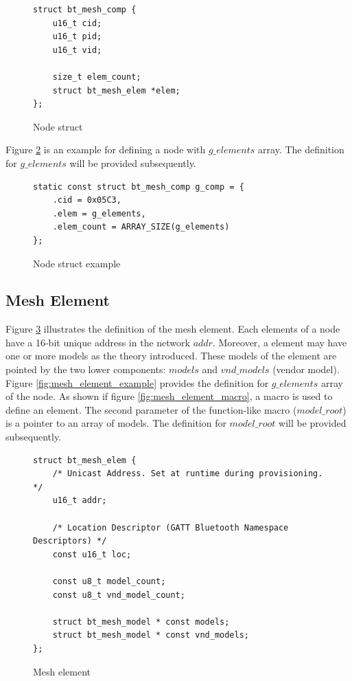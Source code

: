 \documentclass[\main/main.tex]{subfiles}
\begin{document}
\begin{figure}[H]
    \begin{lstlisting}[style=CStyle]
struct bt_mesh_comp {
	u16_t cid;
	u16_t pid;
	u16_t vid;

	size_t elem_count;
	struct bt_mesh_elem *elem;
};
    \end{lstlisting}
    \caption{Node struct}
    \label{fig:node_struct}
\end{figure}

Figure \ref{fig:node_struct_example} is an example for defining a node with $g\_elements$ array. The definition for  $g\_elements$ will be provided subsequently.
\begin{figure}[H]
    \begin{lstlisting}[style=CStyle]
static const struct bt_mesh_comp g_comp = {
    .cid = 0x05C3,
    .elem = g_elements,
    .elem_count = ARRAY_SIZE(g_elements)
};
    \end{lstlisting}
    \caption{Node struct example}
    \label{fig:node_struct_example}
\end{figure}

\subsection{Mesh Element}
Figure \ref{fig:mesh_element} illustrates the definition of the mesh element. Each elements of a node have a 16-bit unique address in the network $addr$. Moreover, a element may have one or more models as the theory introduced. These models of the element are pointed by the two lower components: $models$ and $vnd\_models$ (vendor model). Figure \ref{fig:mesh_element_example} provides the definition for $g\_elements$ array of the node. As shown if figure \ref{fig:mesh_element_macro}, a macro is used to define an element. The second parameter of the function-like macro ($model\_root$) is a pointer to an array of models. The definition for  $model\_root$ will be provided subsequently.
\begin{figure}[H]
    \begin{lstlisting}[style=CStyle]
struct bt_mesh_elem {
    /* Unicast Address. Set at runtime during provisioning. */
    u16_t addr;

    /* Location Descriptor (GATT Bluetooth Namespace Descriptors) */
    const u16_t loc;

    const u8_t model_count;
    const u8_t vnd_model_count;

    struct bt_mesh_model * const models;
    struct bt_mesh_model * const vnd_models;
};
    \end{lstlisting}
    \caption{Mesh element}
    \label{fig:mesh_element}
\end{figure}
\end{document}
